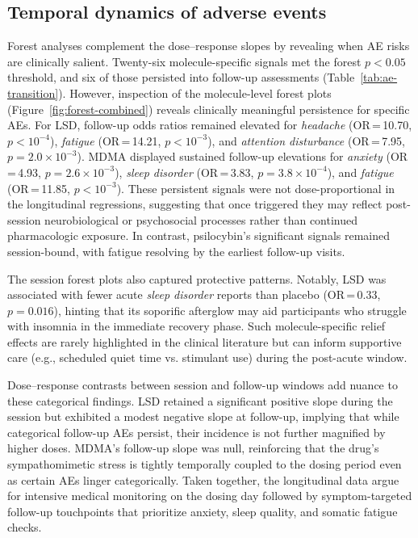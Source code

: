 \subsection{Temporal dynamics of adverse events}

Forest analyses complement the dose--response slopes by revealing when AE risks are clinically salient.
Twenty-six molecule-specific signals met the forest $p<0.05$ threshold, and six of those persisted into follow-up assessments (Table~\ref{tab:ae-transition}).
However, inspection of the molecule-level forest plots (Figure~\ref{fig:forest-combined}) reveals clinically meaningful persistence for specific AEs.
For LSD, follow-up odds ratios remained elevated for \textit{headache} (OR\,=\,10.70, $p<10^{-4}$), \textit{fatigue} (OR\,=\,14.21, $p<10^{-3}$), and \textit{attention disturbance} (OR\,=\,7.95, $p=2.0\times10^{-3}$).
MDMA displayed sustained follow-up elevations for \textit{anxiety} (OR\,=\,4.93, $p=2.6\times10^{-3}$), \textit{sleep disorder} (OR\,=\,3.83, $p=3.8\times10^{-4}$), and \textit{fatigue} (OR\,=\,11.85, $p<10^{-3}$).
These persistent signals were not dose-proportional in the longitudinal regressions, suggesting that once triggered they may reflect post-session neurobiological or psychosocial processes rather than continued pharmacologic exposure.
In contrast, psilocybin’s significant signals remained session-bound, with fatigue resolving by the earliest follow-up visits.

The session forest plots also captured protective patterns.
Notably, LSD was associated with fewer acute \textit{sleep disorder} reports than placebo (OR\,=\,0.33, $p=0.016$), hinting that its soporific afterglow may aid participants who struggle with insomnia in the immediate recovery phase.
Such molecule-specific relief effects are rarely highlighted in the clinical literature but can inform supportive care (e.g., scheduled quiet time vs. stimulant use) during the post-acute window.

Dose--response contrasts between session and follow-up windows add nuance to these categorical findings.
LSD retained a significant positive slope during the session but exhibited a modest negative slope at follow-up, implying that while categorical follow-up AEs persist, their incidence is not further magnified by higher doses.
MDMA’s follow-up slope was null, reinforcing that the drug’s sympathomimetic stress is tightly temporally coupled to the dosing period even as certain AEs linger categorically.
Taken together, the longitudinal data argue for intensive medical monitoring on the dosing day followed by symptom-targeted follow-up touchpoints that prioritize anxiety, sleep quality, and somatic fatigue checks.

